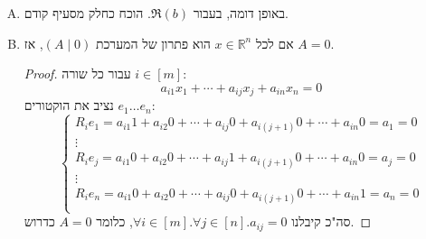 \documentclass[]{article}
\newcommand\R     {\mathbb{R}}
\newcommand\co        {\colon}
\begin{document}
\begin{enumerate}[A.]
\begin{proof}
\begin{gather*}
\begin{pmatrix}
					a_{m1}\Im(z_1) + \cdots + a_{mn}\Im(z_n) + a_{m1}\Re(z_1) + \cdots + a_{mn}\Re(z_n)
				\end{pmatrix} \\ 
				\implies \forall i \in [n]\co b_i = a_{i1}\Im(z_1) + \cdots + a_{in}\Im(z_n) + a_{i1}\Re(z_1) + \cdots + a_{in}\Re(z_n) = R_i\Re(b) + R_i\Im(b)
			\end{gather*}
			נפתור כמו מערכת משוואות מרוכבת רגילה; את האיבר המרוכב בנפרד לאיבר הממשי (נבחין כי $R_i \in \R$ ולכן לא ישנה את הבסיס עליו האיבר רץ). 
			\[ \forall i \in [n]. \Re(b_i) = R_i\Re(b) \ \land \ \Im(b_i) = R_i\Im(b) \implies \Im(b)A = b \land \Re(b)A = b \]
			וסה"כ $\Re(b), \Im(b)$ הם פתרונות חוקיים למטריצה $(A \mid b)$, כדרוש. 
		\end{proof}
		\item באופן דומה, בעבור $\Re(b)$. הוכח כחלק מסעיף קודם. 
		\item אם לכל $x \in \R^n$ הוא פתרון של המערכת $(A \mid 0)$, אז $A = 0$. 
		\begin{proof}
			עבור כל שורה $i \in [m]$: 
			\[ a_{i1}x_1 + \cdots + a_{ij}x_j + a_{in}x_n = 0 \]
			נציב את הוקטורים $e_1 \dots e_n$: 
			\[ \begin{cases}
				R_ie_1 = a_{i1}1 + a_{i2}0 + \cdots + a_{ij} 0 + a_{i(j + 1)}0 + \cdots + a_{in}0 = a_1 = 0 \\
				\vdots \\
				R_ie_j = a_{i1}0 + a_{i2}0 + \cdots + a_{ij} 1 + a_{i(j + 1)}0 + \cdots + a_{in}0 = a_j = 0 \\
				\vdots \\ 
				R_ie_n = a_{i1}0 + a_{i2}0 + \cdots + a_{ij}0 + a_{i(j + 1)}0 + \cdots + a_{in}1 = a_n = 0 \\
			\end{cases} \]
			סה"כ קיבלנו $\forall i \in [m]. \forall j \in [n]. a_{ij} = 0$, כלומר $A = 0 $ כדרוש. 
		\end{proof}
	\end{enumerate}
	
\end{document}
